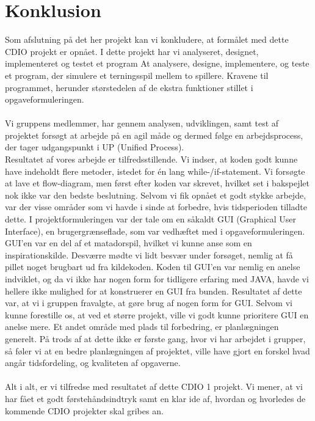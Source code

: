 \chapter{Konklusion}

Som afslutning på det her projekt kan vi konkludere, at formålet med dette CDIO projekt er opnået. 
I dette projekt har vi analyseret, designet, implementeret og testet et program
At analysere, designe, implementere, og teste et program, der simulere et terningsspil mellem to spillere.
Kravene til programmet, herunder størstedelen af de ekstra funktioner stillet i opgaveformuleringen.
\\
\\
Vi gruppens medlemmer, har gennem analysen, udviklingen, samt test af projektet forsøgt at arbejde på en agil måde og dermed følge en arbejdsprocess, der tager udgangspunkt i UP (Unified Process).
\\
Resultatet af vores arbejde er tilfredsstillende.
Vi indser, at koden godt kunne have indeholdt flere metoder, istedet for én lang while-/if-statement.
Vi forsøgte at lave et flow-diagram, men først efter koden var skrevet, hvilket set i bakspejlet nok ikke var den bedste beslutning.
Selvom vi fik opnået et godt stykke arbejde, var der visse områder som vi havde i sinde at forbedre, hvis tidsperioden tilladte dette.
I projektformuleringen var der tale om en såkaldt GUI (Graphical User Interface), en brugergrænseflade, som var vedhæftet med i opgaveformuleringen.
GUI’en var en del af et matadorspil, hvilket vi kunne anse som en inspirationskilde.
Desværre mødte vi lidt besvær under forsøget, nemlig at få pillet noget brugbart ud fra kildekoden.
Koden til GUI’en var nemlig en anelse indviklet, og da vi ikke har nogen form for tidligere erfaring med JAVA, havde vi hellere ikke mulighed for at konstruerer en GUI fra bunden.
Resultatet af dette var, at vi i gruppen fravalgte, at gøre brug af nogen form for GUI.
Selvom vi kunne forestille os, at ved et større projekt, ville vi godt kunne prioritere GUI en anelse mere.
Et andet område med plads til forbedring, er planlægningen generelt. 
På trods af at dette ikke er første gang, hvor vi har arbejdet i grupper, så føler vi at en bedre planlægningen af projektet, ville have gjort en forskel hvad angår tidsfordeling, og kvaliteten af opgaverne.
\\
\\
Alt i alt, er vi tilfredse med resultatet af dette CDIO 1 projekt.
Vi mener, at vi har fået et godt førstehåndsindtryk samt en klar ide af, hvordan og hvorledes de kommende CDIO projekter skal gribes an.
